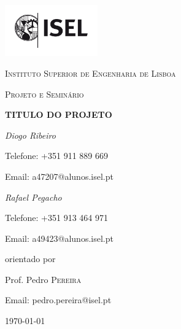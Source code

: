 \documentclass[a4paper,12pt]{article}
\begin{document}
\begin{titlepage}
    \centering
    \includegraphics[width=0.30\textwidth]{logo-isel.png}\par\vspace{1cm}
    {\LARGE \textsc{Instituto Superior de Engenharia de Lisboa}\par}
	\vspace{1cm}
	{\Large \textsc{Projeto e Seminário}\par}
	\vspace{1.5cm}
	{\huge\bfseries TITULO DO PROJETO\par}
    \vspace{2cm}
    {\Large\itshape Diogo Ribeiro\par}
    {\large Telefone: +351 911 889 669 \par}
    {\large Email: a47207@alunos.isel.pt\par}
    \vspace{0.5cm}
    {\Large\itshape Rafael Pegacho\par}
    {\large Telefone: +351 913 464 971 \par}
    {\large Email: a49423@alunos.isel.pt\par}
    \vfill
    orientado por\par
    Prof. Pedro \textsc{Pereira}\par
    Email: pedro.pereira@isel.pt\par
    \vfill
    {\large \today\par}
\end{titlepage}
\end{document}
